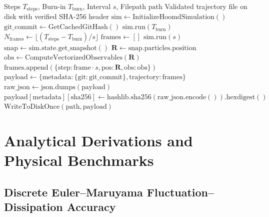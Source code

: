 \documentclass[12pt,a4paper]{article}
\begin{document}
\begin{algorithm}[H]
\caption{Chunked Asynchronous HOOMD Production Loop with SHA-256 Checksum}
\label{alg:hoomd}
\begin{algorithmic}[1]
\Require Steps $T_\text{steps}$, Burn-in $T_\text{burn}$, Interval $s$, Filepath $\mathrm{path}$
\Ensure Validated trajectory file on disk with verified SHA-256 header
\State $\mathrm{sim} \gets \mathrm{InitializeHoomdSimulation}()$
\State $\mathrm{git\_commit} \gets \mathrm{GetCachedGitHash}()$ 
    \State $\mathrm{sim.run}(T_\text{burn})$ 
\EndIf
\State $N_\text{frames} \gets \lfloor (T_\text{steps} - T_\text{burn}) / s \rfloor$
\State $\mathrm{frames} \gets []$
    \State $\mathrm{sim.run}(s)$ 
    \State $\mathrm{snap} \gets \mathrm{sim.state.get\_snapshot}()$ 
    \State $\mathbf{R} \gets \mathrm{snap.particles.position}$
    \State $\mathrm{obs} \gets \mathrm{ComputeVectorizedObservables}(\mathbf{R})$
    \State $\mathrm{frames.append}(\{\mathrm{step}: \mathrm{frame} \cdot s, \mathrm{pos}: \mathbf{R}, \mathrm{obs}: \mathrm{obs}\})$
\EndFor
\State $\mathrm{payload} \gets \{\mathrm{metadata}: \{\mathrm{git}: \mathrm{git\_commit}\}, \mathrm{trajectory}: \mathrm{frames}\}$
\State $\mathrm{raw\_json} \gets \mathrm{json.dumps}(\mathrm{payload})$
\State $\mathrm{payload}[\mathrm{metadata}][\mathrm{sha256}] \gets \mathrm{hashlib.sha256}(\mathrm{raw\_json.encode}()).\mathrm{hexdigest}()$
\State $\mathrm{WriteToDiskOnce}(\mathrm{path}, \mathrm{payload})$ 
\end{algorithmic}
\end{algorithm}


\section{Analytical Derivations and Physical Benchmarks}
\label{app:derivations}

\subsection{Discrete Euler--Maruyama Fluctuation--Dissipation Accuracy}
\label{app:fdt-derivation}
\end{document}
